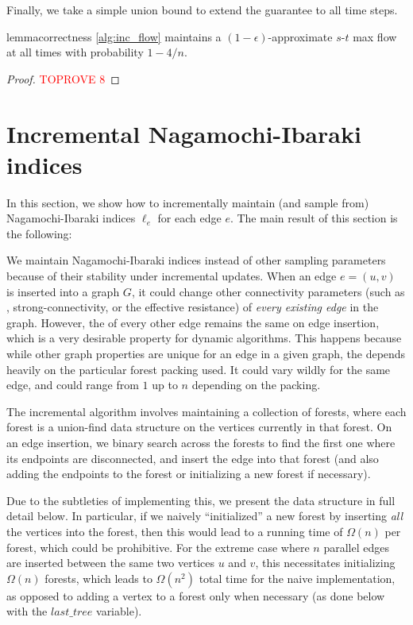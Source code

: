 \documentclass[11pt,a4paper]{article}
\newcommand{\eps}{\epsilon}
\begin{document}
Finally, we take a simple union bound to extend the guarantee to all time steps.

\begin{restatable}{lemma}{correctness}
\label{lem:correctness}
\cref{alg:inc_flow} maintains a $(1-\eps)$-approximate $s$-$t$ max flow at all times with probability $1 - 4/n$.
\end{restatable}
\begin{proof}\textcolor{red}{TOPROVE 8}\end{proof}
\section{Incremental Nagamochi-Ibaraki indices}
\label{sec:inc_ni}

In this section, we show how to incrementally maintain (and sample from) Nagamochi-Ibaraki indices $\ell_e$ for each edge $e$.
The main result of this section is the following:
\NIsample*

We maintain Nagamochi-Ibaraki indices instead of other sampling parameters because of their stability under incremental updates. When an edge $e = (u,v)$ is inserted into a graph $G$, it could change other connectivity parameters (such as \edgeconnectivity, strong-connectivity, or the effective resistance) of \emph{every existing edge} in the graph. However, the \niindex of every other edge remains the same on edge insertion, which is a very desirable property for dynamic algorithms. This happens because while other graph properties are unique for an edge in a given graph, the \niindex depends heavily on the particular forest packing used. It could vary wildly for the same edge, and could range from $1$ up to $n$ depending on the packing.

The incremental algorithm involves maintaining a collection of forests, where each forest is a union-find data structure on the vertices currently in that forest. On an edge insertion, we binary search across the forests to find the first one where its endpoints are disconnected, and insert the edge into that forest (and also adding the endpoints to the forest or initializing a new forest if necessary).

Due to the subtleties of implementing this, we present the data structure in full detail below. In particular, if we naively ``initialized'' a new forest by inserting \emph{all} the vertices into the forest, then this would lead to a running time of $\Omega(n)$ per forest, which could be prohibitive. For the extreme case where $n$ parallel edges are inserted between the same two vertices $u$ and $v$, this necessitates initializing $\Omega(n)$ forests, which leads to $\Omega(n^2)$ total time for the naive implementation, as opposed to adding a vertex to a forest only when necessary (as done below with the $last\_tree$ variable).
\end{document}
